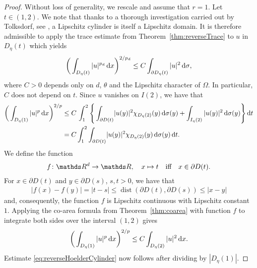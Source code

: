 \begin{proof}
  Without loss of generality, we rescale and assume that $r = 1$.
  Let $t \in (1,2)$. 
  We note that thanks to a thorough investigation carried out by Tolksdorf, see \cite[Lem.\@~1.3.25]{tolksdorf}, a Lipschitz cylinder is itself a Lipschitz domain.
  It is therefore admissible to apply the trace estimate from Theorem~\ref{thm:reverseTrace} to $u$ in $D_\eta(t)$ which yields
  \begin{align*}
    \bigg( \int_{D_\eta(t)} |u|^{p_d} \, {\operatorname{d}\!{x}} \bigg)^{2/p_d} \leq C \int_{\partial D_\eta(t)} |u|^2 \, {\operatorname{d}\!{\sigma}},
  \end{align*}
  where $C > 0$ depends only on $d$, $\theta$ and the Lipschitz character of $\Omega$. In particular, $C$ does not depend on $t$.
  Since $u$ vanishes on $I(2)$, we have that
  \begin{align*}
    \bigg( \int_{D_\eta(1)} |u|^p \d x \bigg)^{2/p} 
    &\leq C\, \int_1^2 \Bigg\{  \int_{\partial D(t)} \! |u(y)|^2 \chi_{D_\eta(2)}(y) \d\sigma(y) +  \int_{I_\eta(2)} |u(y)|^2 \d \sigma(y) \Bigg\} \d t  \\
    &= C \int_1^2 \int_{\partial D(t)} \! |u(y)|^2 \chi_{D_\eta(2)}(y) \d\sigma(y) \d t.
  \end{align*}
  We define the function
  \begin{align*}
    f \colon \R^d \to \R, \quad x \mapsto t \quad\text{iff}\quad x \in \partial D(t).
  \end{align*}
  For $x \in \partial D(t)$ and $y \in \partial D(s)$, $s,t > 0$, we have that
  \begin{align*}
    |f(x) - f(y)| = |t - s| \leq \operatorname{dist}(\partial D(t), \partial D(s)) \leq |x- y|
  \end{align*}
  and, consequently, the function $f$ is Lipschitz continuous with Lipschitz constant $1$.
  Applying the co-area formula from Theorem~\ref{thm:coarea} with function $f$ to integrate both sides over the interval $(1,2)$ gives
  \begin{align*}
    \bigg( \int_{D_\eta(1)} |u|^p \, {\operatorname{d}\!{x}} \bigg)^{2/p} \leq C \int_{D_\eta(2)} |u|^2 \, {\operatorname{d}\!{x}}.
  \end{align*}
  Estimate \eqref{eq:reverseHoelderCylinder} now follows after dividing by $|D_\eta(1)|$.
\end{proof}

